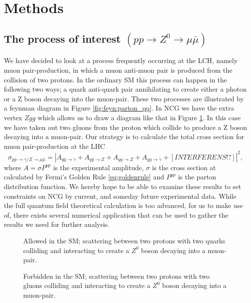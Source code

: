 \section{Methods}

\subsection{The process of interest $(pp \rightarrow Z^0 \rightarrow \mu \bar\mu)$}
We have decided to look at a process frequently occurring at the LCH, namely muon pair-production, in which a muon anti-muon pair is produced from the collision of two protons. In the ordinary SM this process can happen in the following two ways; a quark anti-quark pair annihilating to create either a photon or a Z boson decaying into the muon-pair. These two processes are illustrated by a feynman diagram in Figure \ref{fig:feyn:parton_qq}. In NCG we have the extra vertex $Zgg$ which allows us to draw a diagram like that in Figure \ref{fig:feyn:parton_gg}. In this case we have taken out two gluons from the proton which collide to produce a Z boson decaying into a muon-pair. Our strategy is to calculate the total cross section for muon pair-production at the LHC
\begin{equation}
	\sigma_{pp \rightarrow \gamma/ Z \rightarrow \mu \bar \mu} = |A_{q \bar q \rightarrow \gamma} + A_{q \bar q \rightarrow Z} + A_{gg \rightarrow Z} + A_{gg \rightarrow \gamma} + [INTERFERENS!?]|^{2},
\end{equation}
where $A = \sigma P^{pp}$ is the experimental amplitude, $\sigma$ is the cross section at calculated by Fermi's Golden Rule \eqref{eq:goldenrule} and $P^{pp}$ is the parton distribution function. We hereby hope to be able to examine these results to set constraints on NCG by current, and someday future experimental data. While the full quantum field theoretical calculation is too advanced, for us to make use of, there exists several numerical application that can be used to gather the results we need for further analysis.

\begin{figure}[htp]
	\centering
	\begin{minipage}[b]{0.475\linewidth} 
    \centering
	  
	  \caption{Allowed in the SM; scattering between two protons with two quarks colliding and interacting to create a $Z^0$ boson decaying into a muon-pair.} \label{fig:feyn:parton_qq}
	\end{minipage}
	\hspace{0.5cm}
	\begin{minipage}[b]{0.475\linewidth} 
    \centering
	  
	  \caption{Forbidden in the SM; scattering between two protons with two gluons colliding and interacting to create a $Z^0$ boson decaying into a muon-pair.} \label{fig:feyn:parton_gg}%
	\end{minipage}
\end{figure}


